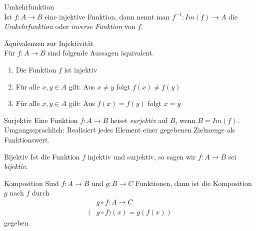 \begin{definition}{Umkehrfunktion}\\
    Ist $f:A\to B$ eine injektive Funktion, dann nennt man $f^{-1}:Im(f)\to A$ die \textit{Umkehrfunktion} oder \textit{inverse Funktion} von $f$.
\end{definition}


\begin{lemma}{Äquivalenzen zur Injektivität}\\
    Für $f:A \to B$ sind folgende Aussagen äquivalent.
    \begin{enumerate}
        \item Die Funktion $f$ ist injektiv
        \item Für alle $x,y\in A$ gilt: Aus $x\neq y$ folgt $f(x)\neq f(y)$
        \item Für alle $x,y\in A$ gilt: Aus $f(x)=f(y)$ folgt $x=y$
    \end{enumerate}
\end{lemma}

\begin{definition}{Surjektiv}
    Eine Funktion $f:A\to B$ heisst \textit{surjektiv} auf $B$, wenn $B=Im(f)$.\\
    Umgangssprachlich: Realisiert jedes Element einer gegebenen Zielmenge als Funktionswert.
\end{definition}

\begin{definition}{Bijektiv}
    Ist die Funktion $f$ injektiv und surjektiv, so sagen wir $f:A\to B$ sei \textit{bijektiv}.
\end{definition}



%
%

\begin{definition}{Komposition}
    Sind $f:A\to B$ und $g:B\to C$ Funktionen, dann ist die Komposition $g$ nach $f$ durch
    \begin{align*}
        &g\circ f:A\to C\\
        (&g\circ f)(x)=g(f(x))
    \end{align*}
    gegeben.
\end{definition}

